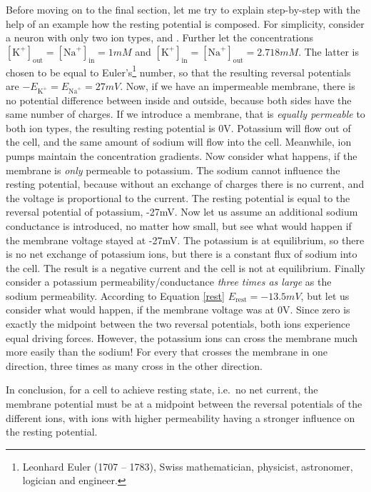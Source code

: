 Before moving on to the final section, let me try to explain step-by-step with the help of an example how the resting potential is composed. For simplicity, consider a neuron with only two ion types,  and . Further let the concentrations $[{\text{K}^+}]_\mathrm{out} = [{\text{Na}^+}]_\mathrm{in} = 1\si{mM}$ and $[{\text{K}^+}]_\mathrm{in} = [{\text{Na}^+}]_\mathrm{out} = 2.718\si{mM}$. The latter is chosen to be equal to Euler's\footnote{Leonhard Euler (1707 -- 1783), Swiss mathematician, physicist, astronomer, logician and engineer.} number, so that the resulting reversal potentials are $-E_{\text{K}^+} = E_{\text{Na}^+} = 27\si{mV}$. Now, if we have an impermeable membrane, there is no potential difference between inside and outside, because both sides have the same number of charges. If we introduce a membrane, that is \textit{equally permeable} to both ion types, the resulting resting potential is 0\si{V}. Potassium will flow out of the cell, and the same amount of sodium will flow into the cell. Meanwhile, ion pumps maintain the concentration gradients. Now consider what happens, if the membrane is \textit{only} permeable to potassium. The sodium cannot influence the resting potential, because without an exchange of charges there is no current, and the voltage is proportional to the current. The resting potential is equal to the reversal potential of potassium, -27\si{mV}. Now let us assume an additional sodium conductance is introduced, no matter how small, but see what would happen if the membrane voltage stayed at -27\si{mV}. The potassium is at equilibrium, so there is no net exchange of potassium ions, but there is a constant flux of sodium into the cell. The result is a negative current and the cell is not at equilibrium. Finally consider a potassium permeability/conductance \textit{three times as large} as the sodium permeability. According to Equation \ref{rest} $E_\mathrm{rest} = -13.5\si{mV}$, but let us consider what would happen, if the membrane voltage was at 0\si{V}. Since zero is exactly the midpoint between the two reversal potentials, both ions experience equal driving forces. However, the potassium ions can cross the membrane much more easily than the sodium! For every  that crosses the membrane in one direction, three times as many  cross in the other direction.

In conclusion, for a cell to achieve resting state, i.e.\ no net current, the membrane potential must be at a midpoint between the reversal potentials of the different ions, with ions with higher permeability having a stronger influence on the resting potential.

